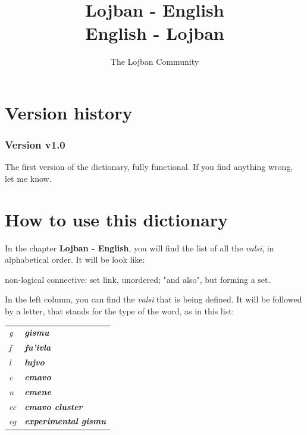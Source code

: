 \documentclass[ipa,twoside]{report}
\author{The Lojban Community}
\title{Lojban - English\\English - Lojban}
\begin{document}
\setlength{\leftfield}{0.1\textwidth}
\setlength{\rightfield}{0.3\textwidth}


\maketitle

\tableofcontents

\chapter*{Version history}
\label{cha:history}
\subsection{Version v1.0}

The first version of the dictionary, fully functional. If you find anything wrong, let me know.

\chapter*{How to use this dictionary}
\label{cha:howto}
In the chapter \textbf{Lojban - English}, you will find the list of all the \textsl{valsi}, in alphabetical order. It will be look like:

\begin{center}
\begin{minipage}[t]{0.55\textwidth}
 	{}{}{}{non-logical connective: set link, unordered; "and also", but forming a set.}
\end{minipage}
\end{center}

In the left column, you can find the \textsl{valsi} that is being defined. It will be followed by a letter, that stands for the type of the word, as in this list:

\begin{tabular}{ l l }
  \textit{g} & \textbf{\emph{gismu}}  \\
  \textit{f} & \textbf{\emph{fu'ivla}}  \\
  \textit{l} & \textbf{\emph{lujvo}}  \\
  \textit{c} & \textbf{\emph{cmavo}} \\
  \textit{n} & \textbf{\emph{cmene}} \\
  \textit{cc} & \textbf{\emph{cmavo cluster}} \\
  \textit{eg} & \textbf{\emph{experimental gismu}} \\
\end{tabular}
\end{document}
